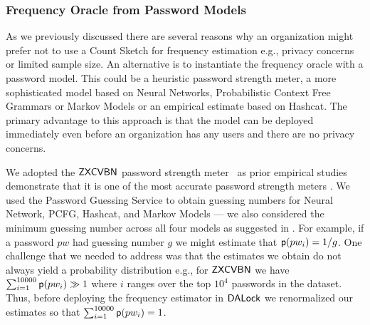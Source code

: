 \subsubsection{Frequency Oracle from Password Models}

As we previously discussed there are several reasons why an organization might prefer not to use a Count Sketch for frequency estimation e.g., privacy concerns or limited sample size. An alternative is to instantiate the frequency oracle with a password model. This could be a heuristic password strength meter, a more sophisticated model based on Neural Networks, Probabilistic Context Free Grammars or Markov Models or an empirical estimate based on Hashcat. The primary advantage to this approach is that the model can be deployed immediately even before an organization has any users and there are no privacy concerns. 


We adopted the $\mathsf{ZXCVBN}$ password strength meter~\cite{USENIX:Wheeler16} as prior empirical studies  demonstrate that it is one of the most accurate password strength meters \cite{CCS:GolDur18}. We used the Password Guessing Service \cite{USENIX:USBCCKKMMS15} to obtain guessing numbers for Neural Network, PCFG, Hashcat, and Markov Models ---  we also considered the  minimum guessing number across all four models as suggested in \cite{USENIX:USBCCKKMMS15}. For example, if a password $pw$ had guessing number $g$ we might estimate that $\textsf{p}(pw_i) =1/g$. One challenge that we needed to address was that the estimates we obtain do not always yield a probability distribution e.g., for $\mathsf{ZXCVBN}$ we have $\sum_{i=1}^{10000}\textsf{p}(pw_i) \gg 1$ where $i$ ranges over the top $10^4$ passwords in the dataset. Thus, before deploying the frequency estimator in $\mathsf{DALock}$ we renormalized our estimates so that $\sum_{i=1}^{10000}\textsf{p}(pw_i) =1$. 




